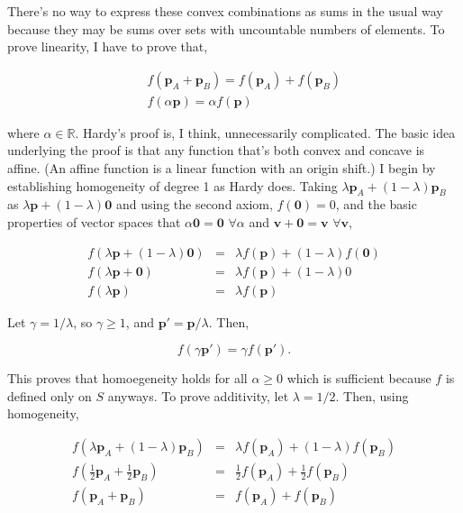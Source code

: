 \documentclass[12pt]{article}
\newcommand{\R}{{\mathbb R}} %
\begin{document}
There's no way to express these convex combinations as sums in the
usual way because they may be sums over sets with uncountable numbers
of elements.  To prove linearity, I have to prove that,

\begin{eqnarray*}
  & & f(\mathbf{p}_A + \mathbf{p}_B) = f(\mathbf{p}_A) + f(\mathbf{p}_B)\\
  & & f(\alpha \mathbf{p}) = \alpha f(\mathbf{p})
\end{eqnarray*}

where $\alpha \in \R$.  Hardy's proof is, I think, unnecessarily
complicated.  The basic idea underlying the proof is that any function
that's both convex and concave is affine.  (An affine function is a
linear function with an origin shift.)  I begin by establishing
homogeneity of degree 1 as Hardy does.  Taking $\lambda \mathbf{p}_A +
(1 - \lambda)\mathbf{p}_B$ as $\lambda \mathbf{p} + (1 -
\lambda)\mathbf{0}$ and using the second axiom, $f(\mathbf{0}) = 0$,
and the basic properties of vector spaces that $\alpha \mathbf{0} =
\mathbf{0}$ $\forall \alpha$ and $\mathbf{v} + \mathbf{0} =
\mathbf{v}$ $\forall \mathbf{v}$,

\begin{eqnarray}
  f(\lambda \mathbf{p} + (1 - \lambda)\mathbf{0}) & = & \lambda
  f(\mathbf{p}) + (1 - \lambda)f(\mathbf{0}) \\
  f(\lambda \mathbf{p} + \mathbf{0}) & = & \lambda f(\mathbf{p}) + (1
  - \lambda) 0 \\
  f(\lambda \mathbf{p}) & = & \lambda f(\mathbf{p})
\end{eqnarray}

Let $\gamma = 1/\lambda$, so $\gamma \geq 1$, and $\mathbf{p}' =
\mathbf{p} / \lambda$.  Then,

\begin{equation}
  \label{eq:homogeneity}
  f(\gamma \mathbf{p}') = \gamma f(\mathbf{p}').
\end{equation}

This proves that homoegeneity holds for all $\alpha \geq 0$ which is
sufficient because $f$ is defined only on $S$ anyways.  To prove
additivity, let $\lambda = 1/2$.  Then, using homogeneity,

\begin{eqnarray*}
  f(\lambda \mathbf{p}_A + (1 - \lambda)\mathbf{p}_B) & = & \lambda
  f(\mathbf{p}_A) + (1 - \lambda)f(\mathbf{p}_B)\\
  f(\frac{1}{2} \mathbf{p}_A + \frac{1}{2} \mathbf{p}_B) & = & \frac{1}{2}
  f(\mathbf{p}_A) + \frac{1}{2} f(\mathbf{p}_B)\\
  f(\mathbf{p}_A + \mathbf{p}_B) & = & f(\mathbf{p}_A) +
  f(\mathbf{p}_B)
\end{eqnarray*}
\end{document}
